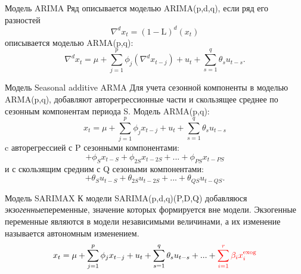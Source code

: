 \begin{frame}{Модель ARIMA}
Ряд описывается моделью ARIMA(p,d,q), если ряд его разностей
\begin{equation*}
\nabla^d x_t = (1 - \mathrm{L})^d(x_t)
\end{equation*}
описывается моделью ARMA(p,q):
\begin{equation*}
\nabla^d x_t = \mu + \sum_{j=1}^{p}\phi_j(\nabla^d x_{t-j}) + u_t + \sum_{s=1}^{q}\theta_s u_{t-s}.
\end{equation*}
\end{frame}
\begin{frame}{Модель Seasonal additive ARMA}
Для учета сезонной компоненты в моделью ARMA(p,q), добавляют авторегрессионные части и скользящее среднее по сезонным компонентам периода S.
\vfill
Модель ARMA(p,q):
\begin{equation*}
x_t = \mu + \sum_{j=1}^{p}\phi_j x_{t-j} + u_t + \sum_{s=1}^{q}\theta_s u_{t-s}
\end{equation*}
c авторегрессией с P сезонными компонентами:
\begin{equation*}
+ \phi_{S} x_{t-S}  + \phi_{2S} x_{t-2S} + ... + \phi_{PS} x_{t-PS}  
\end{equation*}
и с скользящим средним с Q сезоными компонентами:
\begin{equation*}
+ \theta_{S} u_{t-S} + \theta_{2S} u_{t-2S}  + ... + \theta_{QS} u_{t-QS}.
\end{equation*}
\end{frame}
\begin{frame}{Модель SARIMAX}
К модели SARIMA(p,d,q)(P,D,Q) добавляюся \textit{экзогенные}переменные, значение которых формируется вне модели.
Экзогенные переменные являются в модели независимыми величинами, а их изменение называется автономным изменением.
\begin{equation*}
x_t = \mu + \sum_{j=1}^{p}\phi_j x_{t-j} + u_t + \sum_{s=1}^{q}\theta_s u_{t-s} +...+ \textcolor{red}{\sum_{i=1}^{r}\beta_i x^{\text{exog}}_i}
\end{equation*}

\end{frame}

